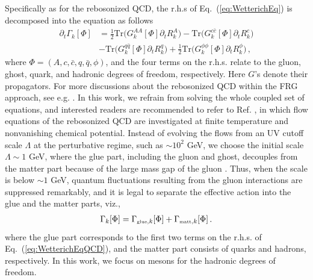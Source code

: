 \documentclass[final,5p,times,twocolumn,colorlinks=true,citecolor=blue,linkcolor=blue]{elsarticle}
\def\Eq#1{Eq.~(\ref{#1})}
\begin{document}
Specifically as for the rebosonized QCD, the r.h.s of \Eq{eq:WetterichEq} is decomposed into the equation as follows
\begin{align}
  \partial_{t}\Gamma_{k}[\Phi]&=\frac{1}{2}\mathrm{Tr}\big(G^{AA}_{k}[\Phi]\partial_{t} R^{A}_{k}\big)-\mathrm{Tr}\big(G^{c\bar c}_{k}[\Phi]\partial_{t} R^{c}_{k}\big)\nonumber \\[2ex]
 &-\mathrm{Tr}\big(G^{q\bar q}_{k}[\Phi]\partial_{t} R^{q}_{k}\big)+\frac{1}{2}\mathrm{Tr}\big(G^{\phi\phi}_{k}[\Phi]\partial_{t} R^{\phi}_{k}\big)\,,
 \label{eq:WetterichEqQCD}
\end{align}
where $\Phi=(A, c, \bar c, q,\bar q, \phi)$, and the four terms on the r.h.s. relate to the gluon, ghost, quark, and hadronic degrees of freedom, respectively. Here $G$'s denote their propagators. For more discussions about the rebosonized QCD within the FRG approach, see e.g. \cite{Pawlowski:2005xe,Pawlowski:2014aha,Mitter:2014wpa,Braun:2014ata,Rennecke:2015eba,Cyrol:2017ewj,Fu:2018a}. In this work, we refrain from solving the whole coupled set of equations, and interested readers are recommended to refer to Ref. \cite{Fu:2018a}, in which flow equations of the rebosonized QCD are investigated at finite temperature and nonvanishing chemical potential. Instead of evolving the flows from an UV cutoff scale $\Lambda$ at the perturbative regime, such as $\sim 10^2$ GeV, we choose the initial scale $\Lambda \sim 1$ GeV, where the glue part, including the gluon and ghost, decouples from the matter part because of the large mass gap of the gluon \cite{Mitter:2014wpa,Braun:2014ata,Cyrol:2017ewj,Fu:2018a}. Thus, when the scale is below $\sim 1$ GeV, quantum fluctuations resulting from the gluon interactions are suppressed remarkably, and it is legal to separate the effective action into the glue and the matter parts, viz.,
\begin{align}
  \Gamma_k[\Phi]=\Gamma_{\text{\tiny{glue}},k}[\Phi]+\Gamma_{\text{\tiny{matt}},k}[\Phi]\,.\label{eq:Gasplit}
\end{align}
where the glue part corresponds to the first two terms on the r.h.s. of \Eq{eq:WetterichEqQCD}, and the matter part consists of quarks and hadrons, respectively. In this work, we focus on mesons for the hadronic degrees of freedom.
\end{document}
